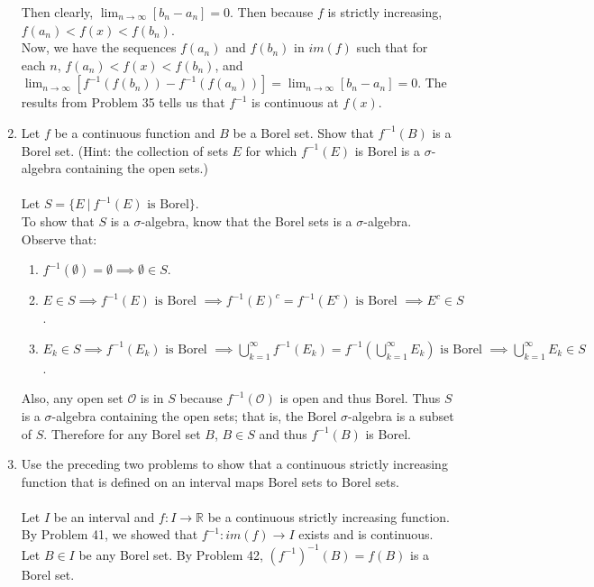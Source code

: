 \begin{enumerate}
	Then clearly, $\lim_{n\to\infty}[b_n-a_n]=0$.
	Then because $f$ is strictly increasing, $f(a_n) < f(x) < f(b_n)$.\\
	Now, we have the sequences $f(a_n)$ and $f(b_n)$ in $im(f)$ such that for each $n$, $f(a_n) < f(x) < f(b_n)$, and $\lim_{n\to\infty}[f^{-1}(f(b_n))-f^{-1}(f(a_n))]=\lim_{n\to\infty}[b_n-a_n]=0$. The results from Problem 35 tells us that $f^{-1}$ is continuous at $f(x)$.
	\item Let $f$ be a continuous function and $B$ be a Borel set. Show that $f^{-1}(B)$ is a Borel set. (Hint: the collection of sets $E$ for which $f^{-1}(E)$ is Borel is a $\sigma$-algebra containing the open sets.)\\
	\\Let $S=\{E\ |\ f^{-1}(E)\text{ is Borel}\}$.\\
	To show that $S$ is a $\sigma$-algebra, know that the Borel sets is a $\sigma$-algebra.\\
	Observe that:
	\begin{enumerate}[label=(\roman*),align=left]
		\item $f^{-1}(\emptyset)=\emptyset\implies\emptyset\in S$.
		\item $E\in S\implies f^{-1}(E)\text{ is Borel }\implies f^{-1}(E)^c=f^{-1}(E^c)\text{ is Borel }\implies E^c\in S$.
		\item $E_k\in S\implies f^{-1}(E_k)\text{ is Borel }\implies\bigcup_{k=1}^\infty f^{-1}(E_k)=f^{-1}(\bigcup_{k=1}^\infty E_k)\text{ is Borel }\implies \bigcup_{k=1}^\infty E_k\in S$.
	\end{enumerate}
	Also, any open set $\mathcal{O}$ is in $S$ because $f^{-1}(\mathcal{O})$ is open and thus Borel.
	Thus $S$ is a $\sigma$-algebra containing the open sets; that is, the Borel $\sigma$-algebra is a subset of $S$.
	Therefore for any Borel set $B$, $B\in S$ and thus $f^{-1}(B)$ is Borel.
	\item Use the preceding two problems to show that a continuous strictly increasing function that is defined on an interval maps Borel sets to Borel sets.\\
	\\Let $I$ be an interval and $f:I\to\mathbb{R}$ be a continuous strictly increasing function.
	\\By Problem 41, we showed that $f^{-1}:im(f)\to I$ exists and is continuous.
	\\Let $B\in I$ be any Borel set. 
	By Problem 42, $(f^{-1})^{-1}(B)=f(B)$ is a Borel set.
\end{enumerate}	
